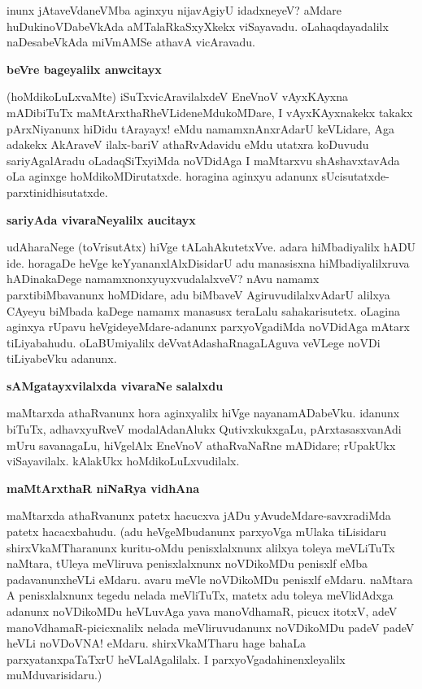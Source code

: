 inunx jAtaveVdaneVMba aginxyu nijavAgiyU idadxneyeV? aMdare 
huDukinoVDabeVkAda \-aMTalaRkaSxyXkekx viSayavadu. oLahaqdayadalilx naDesabeVkAda miVmAMSe athavA vicAravadu.

\textbf{beVre bageyalilx anwcitayx}

(hoMdikoLuLxvaMte) iSuTxvicAravilalxdeV EneVnoV vAyxKAyxna mADibiTuTx 
maMtArxthaRheVLi\-deneMdukoMDare, I vAyxKAyxnakekx takakx pArxNiyanunx 
hiDidu tArayayx! eMdu namamxnAnxrAdarU keVLidare, Aga adakekx 
\-AkAraveV ilalx-bariV athaRvAdavidu eMdu utatxra koDuvudu 
sariyAgalAradu oLadaqSiTxyiMda noVDidAga I maMtarxvu shAshavxtavAda oLa aginxge hoMdikoMDirutatxde. horagina aginxyu adanunx sUcisutatxde-parxtinidhisutatxde.

\textbf{sariyAda vivaraNeyalilx aucitayx}

udAharaNege (toVrisutAtx) hiVge tALahAkutetxVve. adara hiMbadiyalilx 
hADU ide. horagaDe heVge keYyananxlAlxDisidarU adu manasisxna 
hiMbadiyalilxruva hADinakaDege namamxnonxyuyxvudalalxveV? nAvu namamx 
parxtibiMbavanunx hoMDidare, adu biMbaveV AgiruvudilalxvAdarU alilxya CAyeyu biMbada kaDege namamx manasusx teraLalu sahakarisutetx. oLagina aginxya rUpavu heVgideyeMdare-adanunx parxyoVgadiMda noVDidAga mAtarx tiLiyabahudu. oLaBUmiyalilx deVvatAdashaRnagaLAguva veVLege noVDi tiLiyabeVku adanunx.

\textbf{sAMgatayxvilalxda vivaraNe salalxdu}

maMtarxda athaRvanunx hora aginxyalilx hiVge nayanamADabeVku. idanunx biTuTx, adhavxyuRveV modalAdanAlukx QutivxkukxgaLu, pArxtasasxvanAdi mUru savanagaLu, hiVgelAlx EneVnoV athaRvaNaRne mADidare; rUpakUkx viSayavilalx. kAlakUkx hoMdikoLuLxvudilalx.

\textbf{maMtArxthaR niNaRya vidhAna}

maMtarxda athaRvanunx patetx hacucxva jADu yAvudeMdare-savxradiMda patetx hacacxbahudu. (adu heVgeMbudanunx parxyoVga mUlaka tiLisidaru shirxVkaMTharanunx kuritu-oMdu penisxlalxnunx alilxya toleya meVLiTuTx naMtara, tUleya meVliruva penisxlalxnunx noVDikoMDu penisxlf eMba padavanunxheVLi eMdaru. avaru meVle noVDikoMDu penisxlf eMdaru. naMtara A penisxlalxnunx tegedu nelada meVliTuTx, matetx adu toleya meVlidAdxga adanunx noVDikoMDu heVLuvAga yava manoVdhamaR, picucx itotxV, adeV manoVdhamaR-picicxnalilx nelada meVliruvudanunx noVDikoMDu padeV padeV heVLi noVDoVNA! eMdaru. shirxVkaMTharu hage bahaLa parxyatanxpaTaTxrU heVLalAgalilalx. I parxyoVgadahinenxleyalilx muMduvarisidaru.)

